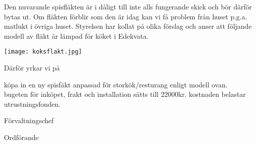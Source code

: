 \documentclass[../_main/handlingar.tex]{subfiles}
\begin{document}

Den nuvarande spisfläkten är i dåligt till inte alls fungerande skick och bör därför bytas ut. Om fläkten förblir som den är idag kan vi få problem från huset p.g.a. matlukt i övriga huset. Styrelsen har kollat på olika förslag och anser att följande modell av fläkt är lämpad för köket i Edekvata.

\begin{center}
   \texttt{[image: koksflakt.jpg]}
\end{center}

Därför yrkar vi på
\begin{attsatser}
    \att köpa in en ny spisfäkt anpassad för storkök/resturang enligt modell ovan.
    \att bugeten för inköpet, frakt och installation sätts till 22000kr.
    \att kostnaden belastar utrustningsfonden.
\end{attsatser}

\begin{signatures}{2}
    \ist
    \signature{Anders Nilsson}{Förvaltningschef}
    \signature{\ordf}{Ordförande}
\end{signatures}
\end{document}
